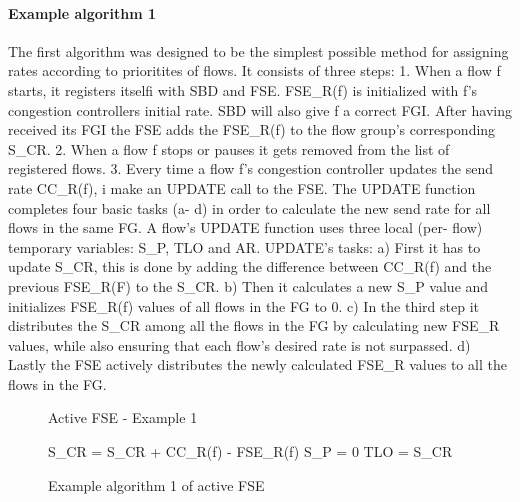 \documentclass[UKenglish]{ifimaster}
\begin{document}
\paragraph{Example algorithm 1}
The first algorithm was designed to be the simplest possible method for assigning rates according to prioritites of flows. 
It consists of three steps:
1. When a flow f starts, it registers itselfi with SBD and FSE. FSE\_R(f) is initialized with f's congestion controllers initial rate. 
SBD will also give f a correct FGI.
After having received its FGI the FSE adds the FSE\_R(f) to the flow group's corresponding S\_CR.
2. When a flow f stops or pauses it gets removed from the list of registered flows.
3. Every time a flow f's congestion controller updates the send rate CC\_R(f), i make an UPDATE call to the FSE.
The UPDATE function completes four basic tasks (a- d) in order to calculate the new send rate for all flows in the same FG.
A flow's UPDATE function uses three local (per- flow) temporary variables: S\_P, TLO and AR.
UPDATE's tasks:
a) First it has to update S\_CR, this is done by adding the difference between CC\_R(f) and the previous FSE\_R(F) to the S\_CR.
b) Then it calculates a new S\_P value and initializes FSE\_R(f) values of all flows in the FG to 0.
c) In the third step it distributes the S\_CR among all the flows in the FG by calculating new FSE\_R values, while also ensuring that each flow's desired rate is not surpassed.
d) Lastly the FSE actively distributes the newly calculated FSE\_R values to all the flows in the FG.

\begin{figure}
\begin{algorithm}[H]
    \SetAlgoLined
    \caption{Active FSE - Example 1}
    S\_CR = S\_CR + CC\_R(f) - FSE\_R(f)\;
    S\_P = 0\;
    TLO = S\_CR\;
\end{algorithm}
\caption{Example algorithm 1 of active FSE}
\label{active-fse-1}
\end{figure}
\end{document}
